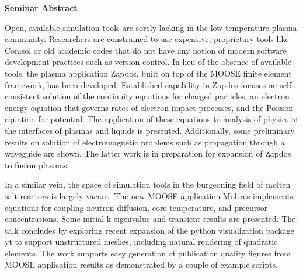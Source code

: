\documentclass[12pt]{article}
\begin{document}
\textbf{Seminar Abstract}

Open, available simulation tools are sorely lacking in the low-temperature
plasma community. Researchers are constrained to use expensive, proprietary
tools like Comsol or old academic codes that do not have any notion of modern
software development practices such as version control. In lieu of the absence
of available tools, the plasma application Zapdos, built on top of
the MOOSE finite element framework, has been developed. Established capability
in Zapdos focuses on self-consistent solution of the continuity equations for
charged particles, an electron energy equation that governs rates of
electron-impact processes, and the Poisson equation for potential. The
application of these equations to analysis of physics at the interfaces of
plasmas and liquids is presented. Additionally, some preliminary results on
solution of electromagnetic problems such as propagation through a waveguide are
shown. The latter work is in preparation for expansion of Zapdos to fusion
plasmas.

In a similar vein, the space of simulation tools in the burgeoning field of
molten salt reactors is largely vacant. The new MOOSE application Moltres
implements equations for coupling neutron diffusion, core temperature, and
precursor concentrations. Some initial k-eigenvalue and transient results are
presented. The talk concludes by exploring recent expansion of the python
visualization package yt to support unstructured meshes, including natural
rendering of quadratic elements. The work supports easy generation of
publication quality figures from MOOSE application results as demonstrated by a
couple of example scripts.
\end{document}
